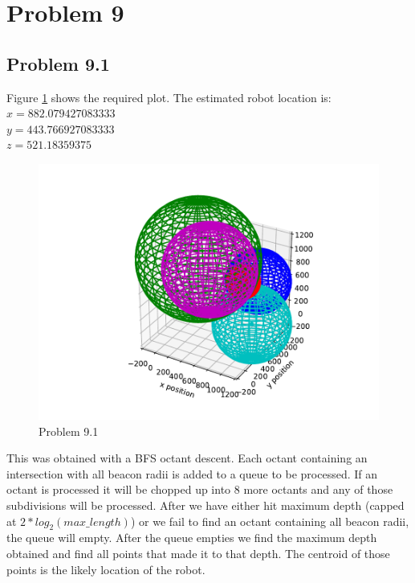 \documentclass{article}
\begin{document}
\newpage
\section{\textbf{Problem 9}}
\subsection{Problem 9.1}
Figure \ref{fig:9.1} shows the required plot. The estimated robot location is:\\
$x = 882.079427083333$\\
$y = 443.766927083333$\\
$z = 521.18359375$\\

\begin{figure}[h]
    \centering
    \includegraphics[pages=1]{problem9-1}
    \caption{Problem 9.1}
    \label{fig:9.1}
\end{figure}

This was obtained with a BFS octant descent. Each octant containing 
an intersection with all beacon radii is added to a queue to be processed. If 
an octant is processed it will be chopped up into 8 more octants and any of 
those subdivisions will be processed. After we have either hit maximum depth 
(capped at $2 * log_2(max\_length)$) or we fail to find an octant containing 
all beacon radii, the queue will empty. After the queue empties we find the 
maximum depth obtained and find all points that made it to that depth. The 
centroid of those points is the likely location of the robot. 
\end{document}
